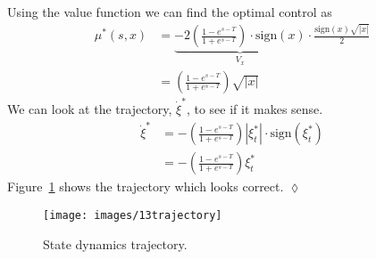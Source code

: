 \begin{example}
Using the value function we can find the optimal control as
\begin{align*}
\mu^\ast(s,x) &= \underbrace{-2\left(\frac{1-e^{s-T}}{1+e^{s-T}}\right)\cdot\text{sign}(x)}_{V_x}\cdot\frac{\text{sign}(x)\sqrt{|x|}}{2} \\
&= \left(\frac{1-e^{s-T}}{1+e^{s-T}}\right)\sqrt{|x|}
\end{align*}
We can look at the trajectory, $\dot{\xi}^\ast$, to see if it makes sense.
\begin{align*}
\dot{\xi}^\ast &= -\left(\frac{1-e^{s-T}}{1+e^{s-T}}\right)|\xi_t^\ast|\cdot\text{sign}(\xi_t^\ast) \\
&= -\left(\frac{1-e^{s-T}}{1+e^{s-T}}\right)\xi_t^\ast
\end{align*}
Figure~\ref{fig:13trajectory} shows the trajectory which looks correct.
$\lozenge$
\end{example}

\begin{figure}[ht!]
\centering
\texttt{[image: images/13trajectory]}
\caption{State dynamics trajectory.}%
\label{fig:13trajectory}
\end{figure}%
